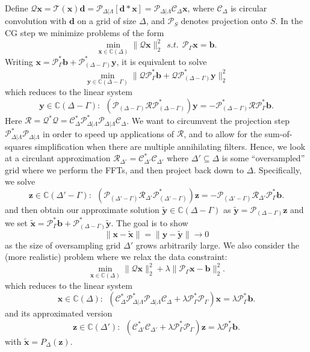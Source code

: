 \documentclass[11pt,draftcls,onecolumn]{IEEEtran}
\newcommand{\mbf}{\mathbf}
\begin{document}
Define $\mathcal{Q}\mbf x = \mathcal{T}(\mbf x) \mbf d = \mathcal{P}_{\Delta|\Lambda}[\mbf d \ast \mbf x] = \mathcal{P}_{\Delta|\Lambda}\mathcal{C}_\Delta\mbf x$, where $\mathcal{C}_\Delta$ is circular convolution with $\mbf d$ on a grid of size $\Delta$, and $\mathcal{P}_S$ denotes projection onto $S$. In the CG step we minimize problems of the form
\[
\min_{\mbf x \in \mathbb{C}(\Delta)} \|\mathcal{Q}\mbf x\|_2^2~~s.t.~~\mathcal{P}_{\Gamma}\mbf x = \mbf b.
\]
Writing $\mbf x = \mathcal{P}^*_\Gamma \mbf b + \mathcal{P}^*_{(\Delta-\Gamma)}\mbf y$, it is equivalent to solve
\[
\min_{\mbf y \in \mathbb{C}(\Delta-\Gamma)} \|\mathcal{Q}\mathcal{P}^*_\Gamma \mbf b + \mathcal{Q}\mathcal{P}^*_{(\Delta-\Gamma)}\mbf y\|_2^2
\]
which reduces to the linear system
\[
\mbf y\in\mathbb{C}(\Delta-\Gamma):~~
(\mathcal{P}_{(\Delta-\Gamma)}\mathcal{R}\mathcal{P}^*_{(\Delta-\Gamma)})\mbf y = -\mathcal{P}^*_{(\Delta-\Gamma)}\mathcal{R}\mathcal{P}^*_\Gamma \mbf b.
\]
Here $\mathcal{R} = \mathcal{Q}^*\mathcal{Q} = \mathcal{C}^*_\Delta \mathcal{P}_{\Delta|\Lambda}^*\mathcal{P}_{\Delta|\Lambda}\mathcal{C}_\Delta$. We want to circumvent the projection step $\mathcal{P}_{\Delta|\Lambda}^*\mathcal{P}_{\Delta|\Lambda}$ in order to speed up applications of $\mathcal{R}$, and to allow for the sum-of-squares simplification when there are multiple annihilating filters. Hence, we look at a circulant approximation $\mathcal{R}_{\Delta'} = \mathcal{C}_{\Delta'}^*\mathcal{C}_{\Delta'}$ where $\Delta' \subseteq \Delta$ is some ``oversampled'' grid where we perform the FFTs, and then project back down to $\Delta$. Specifically, we solve
\[
\mbf z\in\mathbb{C}(\Delta'-\Gamma):~~
(\mathcal{P}_{(\Delta'-\Gamma)}\mathcal{R}_{\Delta'}\mathcal{P}^*_{(\Delta'-\Gamma)})\mbf z = -\mathcal{P}_{(\Delta'-\Gamma)}\mathcal{R}_{\Delta'}\mathcal{P}^*_\Gamma \mbf b.
\]
and then obtain our approximate solution $\widetilde{\mbf y}\in\mathbb{C}(\Delta-\Gamma)$ as $\widetilde{\mbf y} = \mathcal{P}_{(\Delta-\Gamma)}\mbf z$ and we set $\widetilde{\mbf x}= \mathcal{P}^*_\Gamma \mbf b + \mathcal{P}^*_{(\Delta-\Gamma)}\widetilde{\mbf y}$. The goal is to show
\[
\|\mbf x - \widetilde{\mbf x}\| = \|\mbf y - \widetilde{\mbf y}\|\rightarrow 0
\]
as the size of oversampling grid $\Delta'$ grows arbitrarily large. We also consider the (more realistic) problem where we relax the data constraint:
\[
\min_{\mbf x \in \mathbb{C}(\Delta)} \|\mathcal{Q}\mbf x\|_2^2 + \lambda\|\mathcal{P}_{\Gamma}\mbf x - \mbf b\|_2^2.
\]
which reduces to the linear system
\[
\mbf x\in\mathbb{C}(\Delta):~~
(\mathcal{C}_{\Delta}^*\mathcal{P}_{\Delta|\Lambda}^*\mathcal{P}_{\Delta|\Lambda}\mathcal{C}_{\Delta} + \lambda\mathcal{P}^*_\Gamma\mathcal{P}_\Gamma) \mbf x =\lambda\mathcal{P}^*_\Gamma \mbf b.
\]
and its approximated version
\[
\mbf z\in\mathbb{C}(\Delta'):~~
(\mathcal{C}_{\Delta'}^*\mathcal{C}_{\Delta'} + \lambda\mathcal{P}^*_\Gamma\mathcal{P}_\Gamma) \mbf z =\lambda\mathcal{P}^*_\Gamma \mbf b.
\]
with $\widetilde{\mbf x} = P_\Delta(\mbf z)$.
\end{document}
